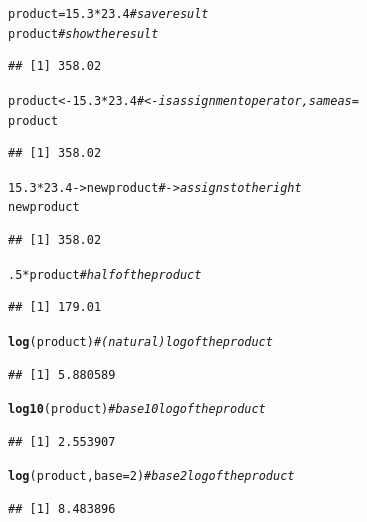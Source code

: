 \documentclass[twoside]{book}\usepackage[]{graphicx}\usepackage[]{xcolor}
\makeatletter
\newcommand{\hlnum}[1]{\textcolor[rgb]{0.686,0.059,0.569}{#1}}%
\newcommand{\hlcom}[1]{\textcolor[rgb]{0.678,0.584,0.686}{\textit{#1}}}%
\newcommand{\hlopt}[1]{\textcolor[rgb]{0,0,0}{#1}}%
\newcommand{\hlstd}[1]{\textcolor[rgb]{0.345,0.345,0.345}{#1}}%
\newcommand{\hlkwb}[1]{\textcolor[rgb]{0.69,0.353,0.396}{#1}}%
\newcommand{\hlkwc}[1]{\textcolor[rgb]{0.333,0.667,0.333}{#1}}%
\newcommand{\hlkwd}[1]{\textcolor[rgb]{0.737,0.353,0.396}{\textbf{#1}}}%
\newenvironment{kframe}{%
 \def\at@end@of@kframe{}%
 \ifinner\ifhmode%
  \def\at@end@of@kframe{\end{minipage}}%
  \begin{minipage}{\columnwidth}%
 \fi\fi%
 \def\FrameCommand##1{\hskip\@totalleftmargin \hskip-\fboxsep
 \colorbox{shadecolor}{##1}\hskip-\fboxsep
     \hskip-\linewidth \hskip-\@totalleftmargin \hskip\columnwidth}%
 \MakeFramed {\advance\hsize-\width
   \@totalleftmargin\z@ \linewidth\hsize
   \@setminipage}}%
 {\par\unskip\endMakeFramed%
 \at@end@of@kframe}
\newenvironment{knitrout}{}{} %
\makeatother
\begin{document}
\begin{knitrout}
\color{fgcolor}\begin{kframe}
\begin{alltt}
\hlstd{product} \hlkwb{=} \hlnum{15.3} \hlopt{*} \hlnum{23.4}       \hlcom{# save result}
\hlstd{product}                     \hlcom{# show the result}
\end{alltt}
\begin{verbatim}
## [1] 358.02
\end{verbatim}
\begin{alltt}
\hlstd{product} \hlkwb{<-} \hlnum{15.3} \hlopt{*} \hlnum{23.4}      \hlcom{# <- is assignment operator, same as =}
\hlstd{product}
\end{alltt}
\begin{verbatim}
## [1] 358.02
\end{verbatim}
\begin{alltt}
\hlnum{15.3} \hlopt{*} \hlnum{23.4} \hlkwb{->} \hlstd{newproduct}   \hlcom{# -> assigns to the right}
\hlstd{newproduct}
\end{alltt}
\begin{verbatim}
## [1] 358.02
\end{verbatim}
\begin{alltt}
\hlnum{.5} \hlopt{*} \hlstd{product}                \hlcom{# half of the product}
\end{alltt}
\begin{verbatim}
## [1] 179.01
\end{verbatim}
\begin{alltt}
\hlkwd{log}\hlstd{(product)}                \hlcom{# (natural) log of the product}
\end{alltt}
\begin{verbatim}
## [1] 5.880589
\end{verbatim}
\begin{alltt}
\hlkwd{log10}\hlstd{(product)}              \hlcom{# base 10 log of the product}
\end{alltt}
\begin{verbatim}
## [1] 2.553907
\end{verbatim}
\begin{alltt}
\hlkwd{log}\hlstd{(product,}\hlkwc{base}\hlstd{=}\hlnum{2}\hlstd{)}         \hlcom{# base 2 log of the product}
\end{alltt}
\begin{verbatim}
## [1] 8.483896
\end{verbatim}
\end{kframe}
\end{knitrout}
\end{document}

